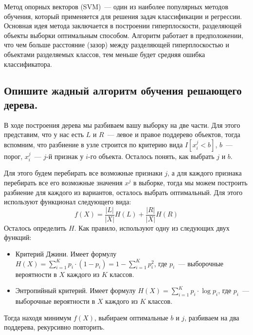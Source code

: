 \begin{definition}
    Метод опорных векторов (SVM)~--- один из наиболее популярных методов обучения, который применяется для решения задач классификации и регрессии. Основная идея метода заключается в построении гиперплоскости, разделяющей объекты выборки оптимальным способом. Алгоритм работает в предположении, что чем больше расстояние (зазор) между разделяющей гиперплоскостью и объектами разделяемых классов, тем меньше будет средняя ошибка классификатора.
\end{definition}














\subsection{Опишите жадный алгоритм обучения решающего дерева.}

В ходе построения дерева мы разбиваем вашу выборку на две части. Для этого представим, что у нас есть $L$ и $R$~--- левое и правое поддерево объектов, тогда вспомним, что разбиение в узле строится по критерию вида $I[x_i^j < b]$, $b$~--- порог, $x_i^j$~--- $j$-й признак у $i$-го объекта. Осталось понять, как выбрать $j$ и $b$.

Для этого будем перебирать все возможные признаки $j$, а для каждого признака перебирать все его возможные значения $x^j$ в выборке, тогда мы можем построить разбиение для каждого из вариантов, осталось выбрать оптимальный. Для этого используют функционал следующего вида:
$$
f(X) = \frac{|L|}{|X|} H(L) + \frac{|R|}{|X|} H(R)
$$
Осталось определить $H$. Как правило, используют одну из следующих двух функций:
\begin{itemize}
    \item Критерий Джини. Имеет формулу $H(X) = \sum\limits_{i = 1}^K p_i \cdot (1 - p_i) = 1 - \sum\limits_{i = 1}^K p_i^2$, где $p_i$~--- выборочные вероятности в $X$ каждого из $K$ классов.
    \item Энтропийный критерий. Имеет формулу $H(X) = \sum\limits_{i = 1}^K p_i \cdot \log p_i$, где $p_i$~--- выборочные вероятности в $X$ каждого из $K$ классов.
\end{itemize}

Тогда находя минимум $f(X)$, выбираем оптимальные $b$ и $j$, разбиваем на два поддерева, рекурсивно повторить.









